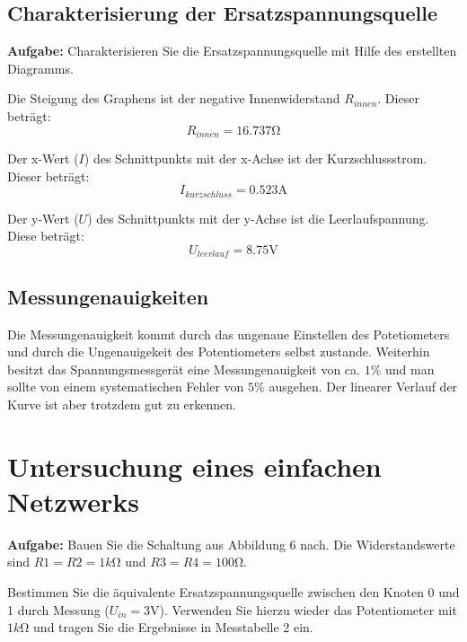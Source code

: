 \documentclass[10pt]{report}
\begin{document}
        \subsection{Charakterisierung der Ersatzspannungsquelle}
        \textbf{Aufgabe:} Charakterisieren Sie die Ersatzspannungsquelle mit Hilfe des erstellten Diagramms.

        \vspace{0.5cm}

        Die Steigung des Graphens ist der negative Innenwiderstand $R_{innen}$.
        Dieser beträgt:
        \begin{equation*}
            R_{innen} = 16.737 \si{\ohm}
        \end{equation*}

        Der x-Wert ($I$) des Schnittpunkts mit der x-Achse ist der Kurzschlussstrom.
        Dieser beträgt:
        \begin{equation*}
            I_{kurzschluss} = 0.523 \si{\ampere}
        \end{equation*}

        Der y-Wert ($U$) des Schnittpunkts mit der y-Achse ist die Leerlaufspannung.
        Diese beträgt:
        \begin{equation*}
            U_{leerlauf} = 8.75 \si{\volt}
        \end{equation*}

        \subsection{Messungenauigkeiten}
        Die Messungenauigkeit kommt durch das ungenaue Einstellen des Potetiometers
        und durch die Ungenauigekeit des Potentiometers selbst zustande. Weiterhin besitzt
		das Spannungsmessgerät eine Messungenauigkeit von ca. $1\%$ und man sollte von einem
		systematischen Fehler von $5\%$ ausgehen. Der linearer Verlauf der Kurve ist aber 
		trotzdem gut zu erkennen.


        \section{Untersuchung eines einfachen Netzwerks}
        \textbf{Aufgabe: }Bauen Sie die Schaltung aus Abbildung 6 nach. Die Widerstandswerte sind $R1 = R2 =
        1 \si{k\ohm}$ und $R3 = R4 = 100\si{\ohm}$.

        Bestimmen Sie die äquivalente Ersatzspannungsquelle zwischen den Knoten 0 und 1 durch
        Messung ($U_{in} = 3\si{\volt}$). Verwenden Sie hierzu wieder das Potentiometer mit $1\si{k\ohm}$ und tragen
        Sie die Ergebnisse in Messtabelle 2 ein.
		
\end{document}
